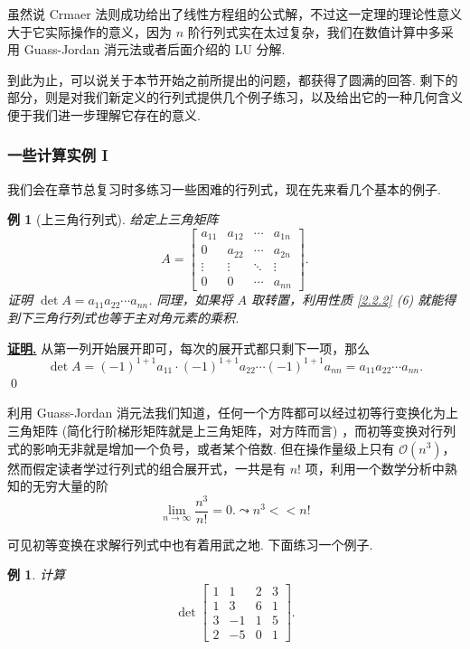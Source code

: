 \documentclass[10pt,openany]{article}
\theoremstyle{thmstyle} %
\theoremstyle{defstyle} %
\theoremstyle{prostyle} %
\theoremstyle{exastyle}
\newtheorem{example}[theorem]{例}
\theoremstyle{remstyle}
\renewenvironment{proof}[1][证明]{\par\underline{\textbf{#1.}} \;\fangsong}{\qed\par}
\begin{document}
虽然说 Crmaer 法则成功给出了线性方程组的公式解，不过这一定理的理论性意义大于它实际操作的意义，因为 \( n \) 阶行列式实在太过复杂，我们在数值计算中多采用 Guass-Jordan 消元法或者后面介绍的 LU 分解.

到此为止，可以说关于本节开始之前所提出的问题，都获得了圆满的回答. 剩下的部分，则是对我们新定义的行列式提供几个例子练习，以及给出它的一种几何含义便于我们进一步理解它存在的意义.

\subsubsection{一些计算实例 I}

我们会在章节总复习时多练习一些困难的行列式，现在先来看几个基本的例子.

\begin{example}[上三角行列式]
	给定上三角矩阵
	\[ A= 
	\begin{bmatrix}
		a_{11} & a_{12} & \cdots & a_{1n} \\
		0      & a_{22} & \cdots & a_{2n} \\
		\vdots & \vdots & \ddots & \vdots \\
		0      & 0      & \cdots & a_{nn}
	\end{bmatrix}. 
	\]
	证明 \( \det A=a_{11}a_{22}\cdots a_{nn} \). 同理，如果将 \( A \) 取转置，利用性质 \ref{2.2.2} (6) 就能得到下三角行列式也等于主对角元素的乘积.
\end{example}

\begin{proof}
	从第一列开始展开即可，每次的展开式都只剩下一项，那么
	\[ \det A= (-1)^{1+1}a_{11} \cdot (-1)^{1+1}a_{22} \cdots (-1)^{1+1} a_{nn}=a_{11}a_{22}\cdots a_{nn}. \]
\end{proof}

利用 Guass-Jordan 消元法我们知道，任何一个方阵都可以经过初等行变换化为上三角矩阵 (简化行阶梯形矩阵就是上三角矩阵，对方阵而言) ，而初等变换对行列式的影响无非就是增加一个负号，或者某个倍数. 但在操作量级上只有 \( \mathcal{O}(n^3) \)，然而假定读者学过行列式的组合展开式，一共是有 \( n! \) 项，利用一个数学分析中熟知的无穷大量的阶
\[ \lim\limits_{n \to \infty} \frac{n^3}{n!}=0. \leadsto n^3<<n!  \]

可见初等变换在求解行列式中也有着用武之地. 下面练习一个例子.

\begin{example}
	计算 \[ \det \begin{bmatrix}
		1 & 1 & 2 & 3 \\
		1 & 3 & 6 & 1 \\
		3 & -1 & 1 & 5 \\
		2 & -5 & 0 & 1
	\end{bmatrix}. \]
\end{example}
\end{document}
